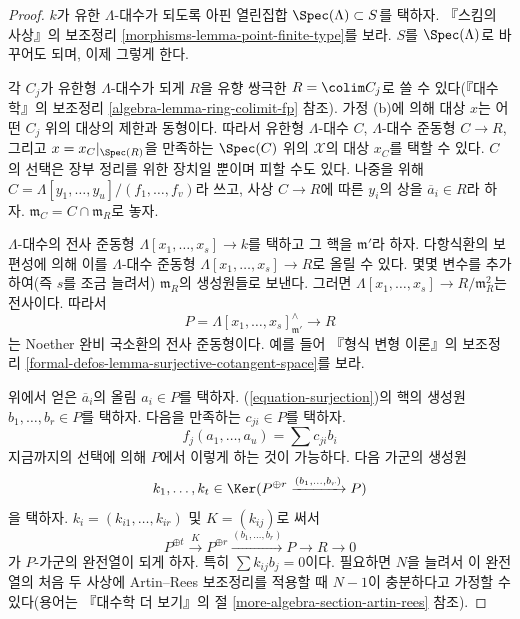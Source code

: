 \begin{proof}
$k$가 유한 $\Lambda$-대수가 되도록 아핀 열린집합
$\Spec(\Lambda) \subset S$를 택하자. 『스킴의 사상』의 보조정리
\ref{morphisms-lemma-point-finite-type}를 보라. $S$를
$\Spec(\Lambda)$로 바꾸어도 되며, 이제 그렇게 한다.

\medskip\noindent
각 $C_j$가 유한형 $\Lambda$-대수가 되게 $R$을 유향 쌍극한
$R = \colim C_j$로 쓸 수 있다(『대수학』의 보조정리
\ref{algebra-lemma-ring-colimit-fp} 참조). 가정 (b)에 의해 대상 $x$는
어떤 $C_j$ 위의 대상의 제한과 동형이다. 따라서 유한형 $\Lambda$-대수
$C$, $\Lambda$-대수 준동형 $C \to R$, 그리고
$x = x_C|_{\Spec(R)}$을 만족하는 $\Spec(C)$ 위의 $\mathcal{X}$의 대상
$x_C$를 택할 수 있다. $C$의 선택은 장부 정리를 위한 장치일 뿐이며
피할 수도 있다. 나중을 위해
$C = \Lambda[y_1, \ldots, y_u]/(f_1, \ldots, f_v)$라 쓰고,
사상 $C \to R$에 따른 $y_i$의 상을 $\overline{a}_i \in R$라 하자.
$\mathfrak m_C = C \cap \mathfrak m_R$로 놓자.

\medskip\noindent
$\Lambda$-대수의 전사 준동형
$\Lambda[x_1, \ldots, x_s] \to k$를 택하고 그 핵을
$\mathfrak m'$라 하자.
다항식환의 보편성에 의해 이를 $\Lambda$-대수 준동형
$\Lambda[x_1, \ldots, x_s] \to R$로 올릴 수 있다. 몇몇 변수를
추가하여(즉 $s$를 조금 늘려서) $\mathfrak m_R$의 생성원들로 보낸다.
그러면 $\Lambda[x_1, \ldots, x_s] \to R/\mathfrak m_R^2$는 전사이다.
따라서
\begin{equation}
\label{equation-surjection}
P = \Lambda[x_1, \ldots, x_s]_{\mathfrak m'}^\wedge \longrightarrow R
\end{equation}
는 Noether 완비 국소환의 전사 준동형이다. 예를 들어 『형식 변형 이론』의
보조정리 \ref{formal-defos-lemma-surjective-cotangent-space}를 보라.

\medskip\noindent
위에서 얻은 $\overline{a}_i$의 올림 $a_i \in P$를 택하자.
(\ref{equation-surjection})의 핵의 생성원
$b_1, \ldots, b_r \in P$를 택하자. 다음을 만족하는
$c_{ji} \in P$를 택하자.
$$
f_j(a_1, \ldots, a_u) = \sum c_{ji} b_i
$$
지금까지의 선택에 의해 $P$에서 이렇게 하는 것이 가능하다. 다음 가군의
생성원
$$
k_1, \ldots, k_t \in
\Ker(P^{\oplus r} \xrightarrow{(b_1, \ldots, b_r)} P)
$$
을 택하자. $k_i = (k_{i1}, \ldots, k_{ir})$ 및 $K = (k_{ij})$로 써서
$$
P^{\oplus t} \xrightarrow{K}
P^{\oplus r} \xrightarrow{(b_1, \ldots, b_r)}
P \to R \to 0
$$
가 $P$-가군의 완전열이 되게 하자. 특히
$\sum k_{ij} b_j = 0$이다. 필요하면 $N$을 늘려서 이 완전열의 처음
두 사상에 Artin--Rees 보조정리를 적용할 때 $N - 1$이 충분하다고
가정할 수 있다(용어는 『대수학 더 보기』의 절
\ref{more-algebra-section-artin-rees} 참조).


\end{proof}
